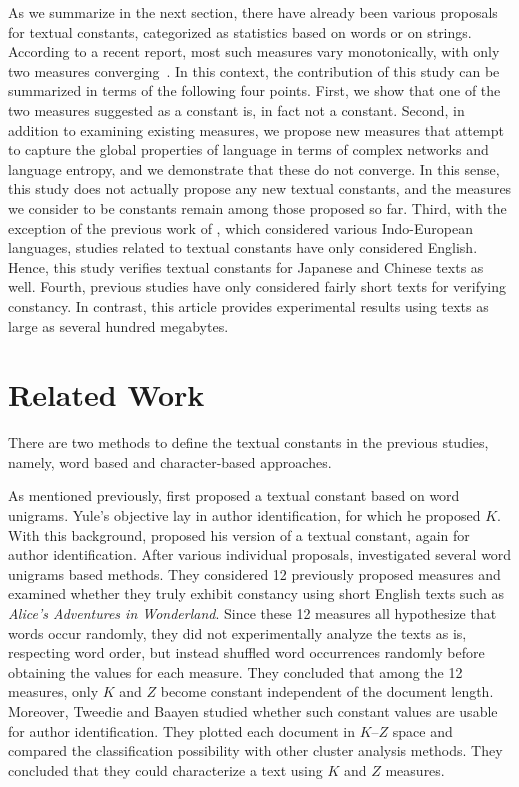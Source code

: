 \documentclass[english]{jnlp_1.4_rep}
\begin{document}
As we summarize in the next section, there have already been various proposals for textual constants, categorized as statistics based on words or on strings. According to a recent report, most such measures vary monotonically, with only two measures converging~\cite{BaayenTweedie}. In this context, the contribution of this study can be summarized in terms of the following four points. First, we show that one of the two measures suggested as a constant is, in fact not a constant. Second, in addition to examining existing measures, we propose new measures that attempt to capture the global properties of language in terms of complex networks and language entropy, and we demonstrate that these do not converge. In this sense, this study does not actually propose any new textual constants, and the measures we consider to be constants remain among those proposed so far. Third, with the exception of the previous work of \cite{Golcher}, which considered various Indo-European languages, studies related to textual constants have only considered  English. Hence, this study verifies textual constants for Japanese and Chinese texts as well. Fourth, previous studies have only considered fairly short texts for verifying constancy. In contrast, this article provides experimental results using texts as large as several hundred megabytes. 


\section{Related Work} 
\label{TandB}

There are two methods to define the textual constants in the previous studies, namely, word based and character-based approaches.

As mentioned previously, \cite{Yule} first proposed a textual constant based on word unigrams. Yule's objective lay in author identification, for which he proposed $K$. With this background, 
\cite{herdan} proposed his version of a textual constant, again for author identification.
After various individual proposals, \cite{BaayenTweedie} 
investigated several word unigrams based methods.
They considered 12 previously proposed measures and examined whether they truly exhibit constancy using short English texts such as {\em Alice's Adventures in Wonderland}. Since these 12 measures all hypothesize that words occur randomly, they did not experimentally analyze the texts as is, respecting word order, but instead shuffled word occurrences randomly before obtaining the values for each measure. They concluded that among the 12 measures, only $K$ and $Z$ become constant independent of the document length. Moreover, Tweedie and Baayen studied whether such constant values are usable for author identification. They plotted each document in $K$--$Z$ space and compared the classification possibility with other cluster analysis methods. They concluded that they could characterize a text using $K$ and $Z$ measures.
\end{document}
